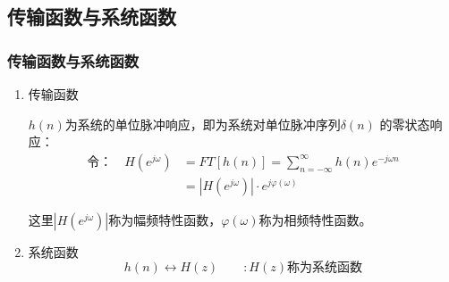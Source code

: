 \documentclass[notheorems,compress,mathserif,table]{beamer}
\begin{document}
\subsection*{传输函数与系统函数}
\begin{frame}[shrink]\frametitle{传输函数与系统函数}%
\begin{enumerate}
\item 传输函数

\par $h(n)$为系统的单位脉冲响应，即为系统对单位脉冲序列$\delta(n)$ 的零状态响应：
\begin{equation*}
\begin{split}
\mbox{令：}\quad H(e^{j\omega}) &= FT[h(n)] = \sum_{n=-\infty}^{\infty}h(n)e^{-j\omega n}\\
&= |H(e^{j\omega})|\cdot e^{j\varphi(\omega)}
\end{split}
\end{equation*}

这里$|H(e^{j\omega})|$称为幅频特性函数，$\varphi(\omega)$称为相频特性函数。

\item 系统函数
$$h(n) \leftrightarrow H(z)\quad\quad : H(z)\mbox{称为系统函数}$$
\end{enumerate}
\end{frame}
\end{document}
